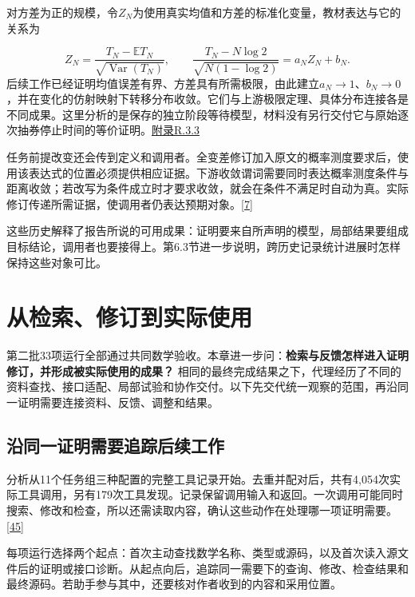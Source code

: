 对方差为正的规模，令$Z_N$为使用真实均值和方差的标准化变量，教材表达与它的关系为

\[
Z_N=\frac{T_N-\mathbb E T_N}{\sqrt{\operatorname{Var}(T_N)}},\qquad
\frac{T_N-N\log2}{\sqrt{N(1-\log2)}}=a_NZ_N+b_N.
\]
后续工作已经证明均值误差有界、方差具有所需极限，由此建立$a_N\to1$、$b_N\to0$，并在变化的仿射映射下转移分布收敛。它们与上游极限定理、具体分布连接各是不同成果。这里分析的是保存的独立阶段等待模型，材料没有另行交付它与原始逐次抽券停止时间的等价证明。\href{zh-appendix.pdf\#r3-3}{附录R.3.3}

任务前提改变还会传到定义和调用者。全变差修订加入原文的概率测度要求后，使用该表达式的位置必须提供相应证据。下游收敛谓词需要同时表达概率测度条件与距离收敛；若改写为条件成立时才要求收敛，就会在条件不满足时自动为真。实际修订传递所需证据，使调用者仍表达预期对象。\hyperlink{ref-7}{\mbox{[7]}}

这些历史解释了报告所说的可用成果：证明要来自所声明的模型，局部结果要组成目标结论，调用者也要接得上。第6.3节进一步说明，跨历史记录统计进展时怎样保持这些对象可比。

\section[从检索、修订到实际使用]{\texorpdfstring{\protect\hypertarget{section-5}{}从检索、修订到实际使用}{从检索、修订到实际使用}}
第二批33项运行全部通过共同数学验收。本章进一步问：\textbf{检索与反馈怎样进入证明修订，并形成被实际使用的成果？} 相同的最终完成结果之下，代理经历了不同的资料查找、接口适配、局部试验和协作交付。以下先交代统一观察的范围，再沿同一证明需要连接资料、反馈、调整和结果。

\subsection[沿同一证明需要追踪后续工作]{\texorpdfstring{\protect\hypertarget{section-5-1}{}沿同一证明需要追踪后续工作}{沿同一证明需要追踪后续工作}}
分析从11个任务组三种配置的完整工具记录开始。去重并配对后，共有4,054次实际工具调用，另有179次工具发现。记录保留调用输入和返回。一次调用可能同时搜索、修改和检查，所以还需读取内容，确认这些动作在处理哪一项证明需要。\hyperlink{ref-45}{\mbox{[45]}}

每项运行选择两个起点：首次主动查找数学名称、类型或源码，以及首次读入源文件后的证明或接口诊断。从起点向后，追踪同一需要下的查询、修改、检查结果和最终源码。若助手参与其中，还要核对作者收到的内容和采用位置。

